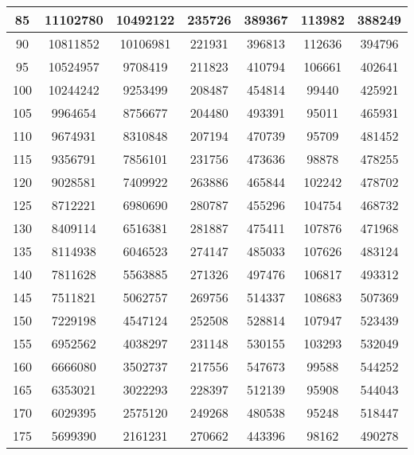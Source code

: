 {\begin{appendices}
\begin{longtable}{|>{\small}c|>{\small}c|>{\small}c|>{\small}c|>{\small}c|>{\small}c|>{\small}c|}
\hline
        85 &   11102780 &   10492122 &     235726 &     389367 &     113982 &     388249 \\
\hline
        90 &   10811852 &   10106981 &     221931 &     396813 &     112636 &     394796 \\
\hline
        95 &   10524957 &    9708419 &     211823 &     410794 &     106661 &     402641 \\
\hline
       100 &   10244242 &    9253499 &     208487 &     454814 &      99440 &     425921 \\
\hline
       105 &    9964654 &    8756677 &     204480 &     493391 &      95011 &     465931 \\
\hline
       110 &    9674931 &    8310848 &     207194 &     470739 &      95709 &     481452 \\
\hline
       115 &    9356791 &    7856101 &     231756 &     473636 &      98878 &     478255 \\
\hline
       120 &    9028581 &    7409922 &     263886 &     465844 &     102242 &     478702 \\
\hline
       125 &    8712221 &    6980690 &     280787 &     455296 &     104754 &     468732 \\
\hline
       130 &    8409114 &    6516381 &     281887 &     475411 &     107876 &     471968 \\
\hline
       135 &    8114938 &    6046523 &     274147 &     485033 &     107626 &     483124 \\
\hline
       140 &    7811628 &    5563885 &     271326 &     497476 &     106817 &     493312 \\
\hline
       145 &    7511821 &    5062757 &     269756 &     514337 &     108683 &     507369 \\
\hline
       150 &    7229198 &    4547124 &     252508 &     528814 &     107947 &     523439 \\
\hline
       155 &    6952562 &    4038297 &     231148 &     530155 &     103293 &     532049 \\
\hline
       160 &    6666080 &    3502737 &     217556 &     547673 &      99588 &     544252 \\
\hline
       165 &    6353021 &    3022293 &     228397 &     512139 &      95908 &     544043 \\
\hline
       170 &    6029395 &    2575120 &     249268 &     480538 &      95248 &     518447 \\
\hline
       175 &    5699390 &    2161231 &     270662 &     443396 &      98162 &     490278 \\

\end{longtable}
\end{appendices}}
